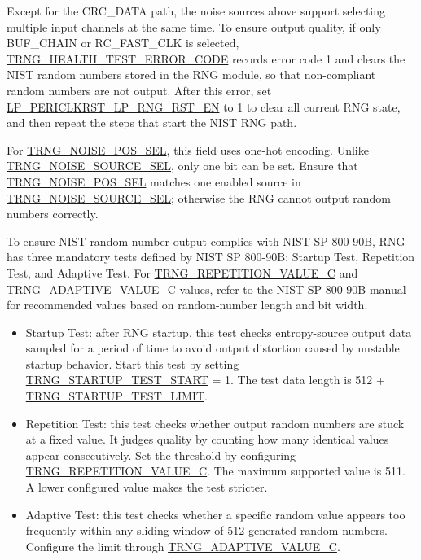 \documentclass[main\_\_EN.tex]{subfiles}
\begin{document}
Except for the CRC\_DATA path, the noise sources above support selecting multiple input channels at the same time. To ensure output quality, if only BUF\_CHAIN or RC\_FAST\_CLK is selected, \hyperref[fielddesc:TRNGHEALTHTESTERRORCODE]{TRNG\_HEALTH\_TEST\_ERROR\_CODE} records error code 1 and clears the NIST random numbers stored in the RNG module, so that non-compliant random numbers are not output. After this error, set \hyperref[fielddesc:LPPERICLKRSTLPRNGRSTEN]{LP\_PERICLKRST\_LP\_RNG\_RST\_EN} to 1 to clear all current RNG state, and then repeat the steps that start the NIST RNG path.

For \hyperref[fielddesc:TRNGNOISEPOSSEL]{TRNG\_NOISE\_POS\_SEL}, this field uses one-hot encoding. Unlike \hyperref[fielddesc:TRNGNOISESOURCESEL]{TRNG\_NOISE\_SOURCE\_SEL}, only one bit can be set. Ensure that \hyperref[fielddesc:TRNGNOISEPOSSEL]{TRNG\_NOISE\_POS\_SEL} matches one enabled source in \hyperref[fielddesc:TRNGNOISESOURCESEL]{TRNG\_NOISE\_SOURCE\_SEL}; otherwise the RNG cannot output random numbers correctly.

To ensure NIST random number output complies with NIST SP 800-90B, RNG has three mandatory tests defined by NIST SP 800-90B: Startup Test, Repetition Test, and Adaptive Test. For \hyperref[fielddesc:TRNGREPETITIONVALUEC]{TRNG\_REPETITION\_VALUE\_C} and \hyperref[fielddesc:TRNGADAPTIVEVALUEC]{TRNG\_ADAPTIVE\_VALUE\_C} values, refer to the NIST SP 800-90B manual for recommended values based on random-number length and bit width.
\begin{itemize}
    \item Startup Test: after RNG startup, this test checks entropy-source output data sampled for a period of time to avoid output distortion caused by unstable startup behavior. Start this test by setting \hyperref[fielddesc:TRNGSTARTUPTESTSTART]{TRNG\_STARTUP\_TEST\_START} = 1. The test data length is 512 + \hyperref[fielddesc:TRNGSTARTUPTESTLIMIT]{TRNG\_STARTUP\_TEST\_LIMIT}.
    \item Repetition Test: this test checks whether output random numbers are stuck at a fixed value. It judges quality by counting how many identical values appear consecutively. Set the threshold by configuring \hyperref[fielddesc:TRNGREPETITIONVALUEC]{TRNG\_REPETITION\_VALUE\_C}. The maximum supported value is 511. A lower configured value makes the test stricter.
    \item Adaptive Test: this test checks whether a specific random value appears too frequently within any sliding window of 512 generated random numbers. Configure the limit through \hyperref[fielddesc:TRNGADAPTIVEVALUEC]{TRNG\_ADAPTIVE\_VALUE\_C}.
\end{itemize}
\end{document}
